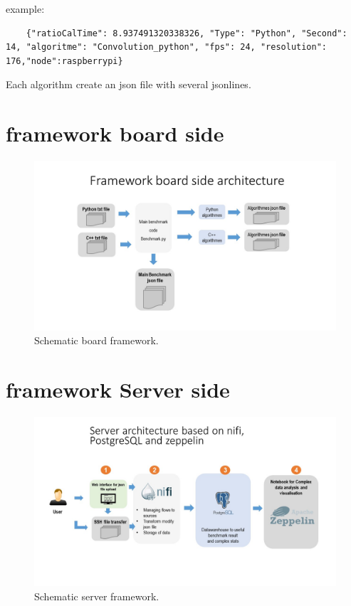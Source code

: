\documentclass[english]{book_template} %
\begin{document}
example: 
	\begin{lstlisting}
	{"ratioCalTime": 8.937491320338326, "Type": "Python", "Second": 14, "algoritme": "Convolution_python", "fps": 24, "resolution": 176,"node":raspberrypi}
	\end{lstlisting}
   
Each algorithm create an json file with several jsonlines. 
  
\section{framework board side}

\begin{figure}[H]
\center
\caption{Schematic board framework.\label{fig:board Arch}}
\includegraphics[scale=0.55]{./img/boardArch.jpg}
\end{figure} 

\section{framework Server side}
\begin{figure}[H]
\center
\caption{Schematic server framework.\label{fig:server Arch}}
\includegraphics[scale=0.55]{./img/serverArch.jpg}
\end{figure} 
\end{document}
